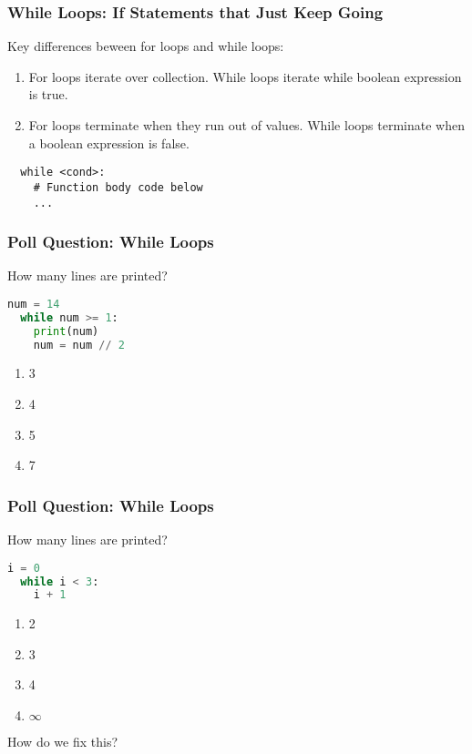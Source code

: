 \documentclass{beamer}
\begin{document}
%
%
%
\begin{frame}[fragile]
  \frametitle{While Loops: If Statements that Just Keep Going}
    Key differences beween for loops and while loops:
    \begin{enumerate}
      \item For loops iterate over collection. While loops iterate while boolean expression is true.
      \item For loops terminate when they run out of values. While loops terminate when a boolean expression is false.
    \end{enumerate}
    \vfill
  \begin{lstlisting}
  while <cond>:
    # Function body code below
    ...
  \end{lstlisting}
\end{frame}

%
%
\begin{frame}[fragile]
  \frametitle{Poll Question: While Loops}
  How many lines are printed?
  \begin{lstlisting}[language=Python, autogobble]
  num = 14
  while num >= 1:
    print(num)
    num = num // 2
  \end{lstlisting}
  \vfill
  \begin{enumerate}[A]
    \item 3
    \item 4
    \item 5
    \item 7
  \end{enumerate}
\end{frame}

%
%
\begin{frame}[fragile]
  \frametitle{Poll Question: While Loops}
  How many lines are printed?
  \begin{lstlisting}[language=Python, autogobble]
  i = 0 
  while i < 3:
    i + 1
  \end{lstlisting}
  \vfill
  \begin{enumerate}[A]
    \item 2
    \item 3
    \item 4
    \item $\infty$
  \end{enumerate}
  \pause
  How do we fix this?
\end{frame}
\end{document}
